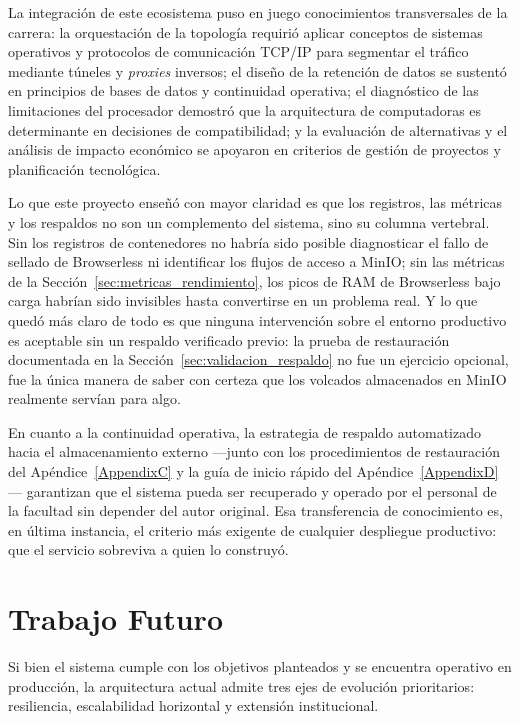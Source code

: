 La integración de este ecosistema puso en juego conocimientos transversales de la carrera: la orquestación de la topología requirió aplicar conceptos de sistemas operativos y protocolos de comunicación TCP/IP para segmentar el tráfico mediante túneles y \textit{proxies} inversos; el diseño de la retención de datos se sustentó en principios de bases de datos y continuidad operativa; el diagnóstico de las limitaciones del procesador demostró que la arquitectura de computadoras es determinante en decisiones de compatibilidad; y la evaluación de alternativas y el análisis de impacto económico se apoyaron en criterios de gestión de proyectos y planificación tecnológica.

Lo que este proyecto enseñó con mayor claridad es que los registros, las métricas y los respaldos no son un complemento del sistema, sino su columna vertebral. Sin los registros de contenedores no habría sido posible diagnosticar el fallo de sellado de Browserless ni identificar los flujos de acceso a MinIO; sin las métricas de la Sección~\ref{sec:metricas_rendimiento}, los picos de RAM de Browserless bajo carga habrían sido invisibles hasta convertirse en un problema real. Y lo que quedó más claro de todo es que ninguna intervención sobre el entorno productivo es aceptable sin un respaldo verificado previo: la prueba de restauración documentada en la Sección~\ref{sec:validacion_respaldo} no fue un ejercicio opcional, fue la única manera de saber con certeza que los volcados almacenados en MinIO realmente servían para algo.

En cuanto a la continuidad operativa, la estrategia de respaldo automatizado hacia el almacenamiento externo ---junto con los procedimientos de restauración del Apéndice~\ref{AppendixC} y la guía de inicio rápido del Apéndice~\ref{AppendixD}--- garantizan que el sistema pueda ser recuperado y operado por el personal de la facultad sin depender del autor original. Esa transferencia de conocimiento es, en última instancia, el criterio más exigente de cualquier despliegue productivo: que el servicio sobreviva a quien lo construyó.


\section{Trabajo Futuro}
\label{sec:trabajo_futuro}

Si bien el sistema cumple con los objetivos planteados y se encuentra operativo en producción, la arquitectura actual admite tres ejes de evolución prioritarios: resiliencia, escalabilidad horizontal y extensión institucional.

